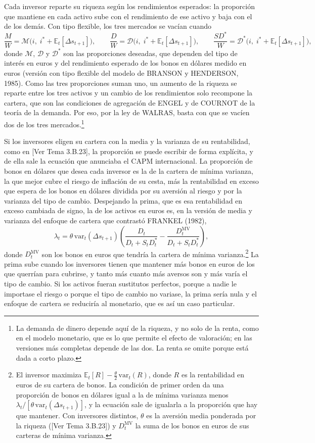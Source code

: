 \documentclass[10pt,a4paper]{article}
\newcommand{\authorfont}[1]{{\fontfamily{EBGaramond-TLF}\selectfont #1}}
\begin{document}
Cada inversor reparte su riqueza según los rendimientos esperados: la proporción que mantiene en cada activo sube con el rendimiento de ese activo y baja con el de los demás. Con tipo flexible, los tres mercados se vacían cuando
$$\frac{M}{W}=\mathcal{M}\big(i,\;i^*+\mathbb{E}_t[\Delta s_{t+1}]\big),\qquad\frac{D}{W}=\mathcal{D}\big(i,\;i^*+\mathbb{E}_t[\Delta s_{t+1}]\big),\qquad\frac{SD^*}{W}=\mathcal{D}^*\big(i,\;i^*+\mathbb{E}_t[\Delta s_{t+1}]\big),$$
donde $\mathcal{M}$, $\mathcal{D}$ y $\mathcal{D}^*$ son las proporciones deseadas, que dependen del tipo de interés en euros y del rendimiento esperado de los bonos en dólares medido en euros (versión con tipo flexible del modelo de BRANSON y HENDERSON, 1985). Como las tres proporciones suman uno, un aumento de la riqueza se reparte entre los tres activos y un cambio de los rendimientos solo recompone la cartera, que son las condiciones de agregación de ENGEL y de COURNOT de la teoría de la demanda. Por eso, por la ley de WALRAS, basta con que se vacíen dos de los tres mercados.\footnote{%
    La demanda de dinero depende aquí de la riqueza, y no solo de la renta, como en el modelo monetario, que es lo que permite el efecto de valoración; en las versiones más completas depende de las dos. La renta se omite porque está dada a corto plazo.
}

Si los inversores eligen su cartera con la media y la varianza de su rentabilidad, como en [\authorfont{Ver Tema 3.B.23}], la proporción se puede escribir de forma explícita, y de ella sale la ecuación que anunciaba el CAPM internacional. La proporción de bonos en dólares que desea cada inversor es la de la cartera de mínima varianza, la que mejor cubre el riesgo de inflación de su cesta, más la rentabilidad en exceso que espera de los bonos en dólares dividida por su aversión al riesgo y por la varianza del tipo de cambio. Despejando la prima, que es esa rentabilidad en exceso cambiada de signo, la de los activos en euros es, en la versión de media y varianza del enfoque de cartera que contrastó FRANKEL (1982),
$$\lambda_t=\theta\,\mathrm{var}_t(\Delta s_{t+1})\left(\frac{D_t}{D_t+S_tD_t^*}-\frac{D_t^{\mathrm{MV}}}{D_t+S_tD_t^*}\right),$$
donde $D_t^{\mathrm{MV}}$ son los bonos en euros que tendría la cartera de mínima varianza.\footnote{%
    El inversor maximiza $\mathbb{E}_t[R]-\tfrac{\theta}{2}\,\mathrm{var}_t(R)$, donde $R$ es la rentabilidad en euros de su cartera de bonos. La condición de primer orden da una proporción de bonos en dólares igual a la de mínima varianza menos $\lambda_t/[\theta\,\mathrm{var}_t(\Delta s_{t+1})]$, y la ecuación sale de igualarla a la proporción que hay que mantener. Con inversores distintos, $\theta$ es la aversión media ponderada por la riqueza ([\authorfont{Ver Tema 3.B.23}]) y $D_t^{\mathrm{MV}}$ la suma de los bonos en euros de sus carteras de mínima varianza.
} La prima sube cuando los inversores tienen que mantener más bonos en euros de los que querrían para cubrirse, y tanto más cuanto más aversos son y más varía el tipo de cambio. Si los activos fueran sustitutos perfectos, porque a nadie le importase el riesgo o porque el tipo de cambio no variase, la prima sería nula y el enfoque de cartera se reduciría al monetario, que es así un caso particular.
\end{document}

